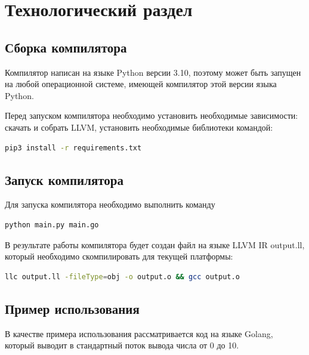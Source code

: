 \section{Технологический раздел}\label{sec:technic}
\subsection{Сборка компилятора}
Компилятор написан на языке Python версии 3.10, поэтому может быть запущен на любой операционной системе, имеющей
компилятор этой версии языка Python.

Перед запуском компилятора необходимо установить необходимые зависимости: скачать и собрать LLVM,
установить необходимые библиотеки командой:
\begin{lstlisting}[language=bash,caption={Установка зависимостей},label={lst:install}]
    pip3 install -r requirements.txt
\end{lstlisting}


\subsection{Запуск компилятора}\label{subsec:run}
Для запуска компилятора необходимо выполнить команду
\begin{lstlisting}[language=bash,caption={Установка зависимостей},label={lst:install}]
    python main.py main.go
\end{lstlisting}

В результате работы компилятора будет создан файл на языке LLVM IR output.ll, который необходимо скомпилировать для
текущей платформы:
\begin{lstlisting}[language=bash,caption={Установка зависимостей},label={lst:install}]
    llc output.ll -fileType=obj -o output.o && gcc output.o
\end{lstlisting}

\subsection{Пример использования}
В качестве примера использования рассматривается код на языке Golang, который выводит в стандартный поток вывода числа от
0 до 10.

\begingroup
    
\endgroup

